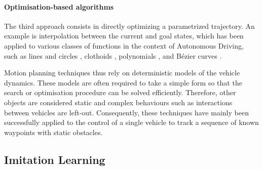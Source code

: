 \paragraph{Optimisation-based algorithms}

The third approach consists in directly optimizing a parametrized trajectory. An example is interpolation between the current and goal states, which has been applied to various classes of functions in the context of Autonomous Driving, such as lines and circles \citep{Reeds1990}, clothoids \citep{Funke2012}, polynomials \citep{Xu2012}, and Bézier curves \citep{Gonzalez}.

Motion planning techniques thus rely on deterministic models of the vehicle dynamics. These models are often required to take a simple form so that the search or optimisation procedure can be solved efficiently. Therefore, other objects are considered static and complex behaviours such as interactions between vehicles are left-out.
Consequently, these techniques have mainly been successfully applied to the control of a single vehicle to track a sequence of known waypoints with static obstacles.

\subsection{Imitation Learning}

